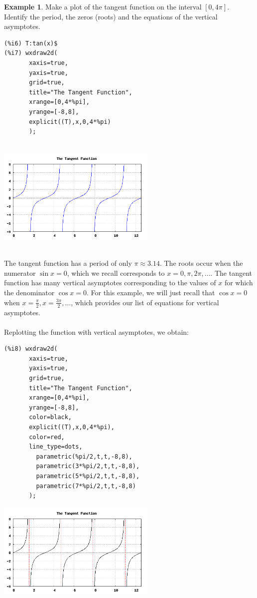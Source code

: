 \documentclass[10.5pt,twoside]{report}
\theoremstyle{definition}
\newtheorem{exmp}{Example}[section]
\begin{document}
\begin{exmp}

Make a plot of the tangent function on the interval $[0,4\pi]$.  Identify the period, the zeros (roots) and the equations of the vertical asymptotes.\\


\begin{verbatim}
(%i6) T:tan(x)$
(%i7) wxdraw2d(
       xaxis=true,
       yaxis=true,
       grid=true,
       title="The Tangent Function",
       xrange=[0,4*%pi],
       yrange=[-8,8],
       explicit((T),x,0,4*%pi)
       );
 
\end{verbatim}

\includegraphics[width=3in]{example_1_2_2_1}

${}$\\

The tangent function has a period of only $\pi\approx3.14$.  The roots occur when the numerator $\sin{x}=0$, which we recall corresponds to $x={0},{\pi},{2\pi},{\dots}$.  The tangent function has many vertical asymptotes corresponding to the values of $x$ for which the denominator $\cos{x}=0$.  For this example, we will just recall that $\cos{x}=0$ when $x=\frac{\pi}{2},x=\frac{3\pi}{2},\dots$, which provides our list of equations for vertical asymptotes.\\

${}$\\

Replotting the function with vertical asymptotes, we obtain:\\

\begin{verbatim}
(%i8) wxdraw2d(
       xaxis=true,
       yaxis=true,
       grid=true,
       title="The Tangent Function",
       xrange=[0,4*%pi],
       yrange=[-8,8],
       color=black,
       explicit((T),x,0,4*%pi),
       color=red,
       line_type=dots,
         parametric(%pi/2,t,t,-8,8),
         parametric(3*%pi/2,t,t,-8,8),
         parametric(5*%pi/2,t,t,-8,8),
         parametric(7*%pi/2,t,t,-8,8)
       );
\end{verbatim}

\includegraphics[width=3in]{example_1_2_2_2}


\end{exmp}
\end{document}
